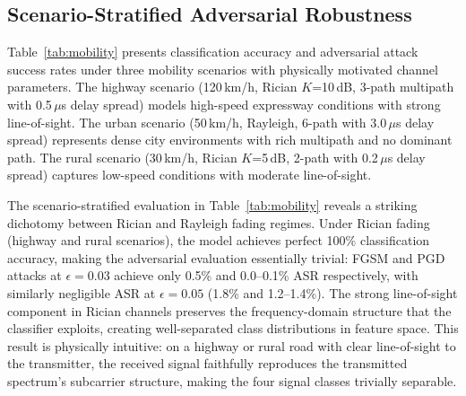 \documentclass[conference]{IEEEtran}
\begin{document}
\subsection{Scenario-Stratified Adversarial Robustness}

\label{sec:mobility}

Table~\ref{tab:mobility} presents classification accuracy and adversarial attack success rates under three mobility scenarios with physically motivated channel parameters. The highway scenario (120\,km/h, Rician $K$=10\,dB, 3-path multipath with 0.5\,$\mu$s delay spread) models high-speed expressway conditions with strong line-of-sight. The urban scenario (50\,km/h, Rayleigh, 6-path with 3.0\,$\mu$s delay spread) represents dense city environments with rich multipath and no dominant path. The rural scenario (30\,km/h, Rician $K$=5\,dB, 2-path with 0.2\,$\mu$s delay spread) captures low-speed conditions with moderate line-of-sight.

\begin{table}[t]
\centering
\caption{Scenario-Stratified Accuracy and Adversarial Robustness (3-Seed Mean $\pm$ Std)}\label{tab:mobility}
\end{table}

The scenario-stratified evaluation in Table~\ref{tab:mobility} reveals a striking dichotomy between Rician and Rayleigh fading regimes. Under Rician fading (highway and rural scenarios), the model achieves perfect 100\% classification accuracy, making the adversarial evaluation essentially trivial: FGSM and PGD attacks at $\epsilon=0.03$ achieve only 0.5\% and 0.0--0.1\% ASR respectively, with similarly negligible ASR at $\epsilon=0.05$ (1.8\% and 1.2--1.4\%). The strong line-of-sight component in Rician channels preserves the frequency-domain structure that the classifier exploits, creating well-separated class distributions in feature space. This result is physically intuitive: on a highway or rural road with clear line-of-sight to the transmitter, the received signal faithfully reproduces the transmitted spectrum's subcarrier structure, making the four signal classes trivially separable.
\end{document}

